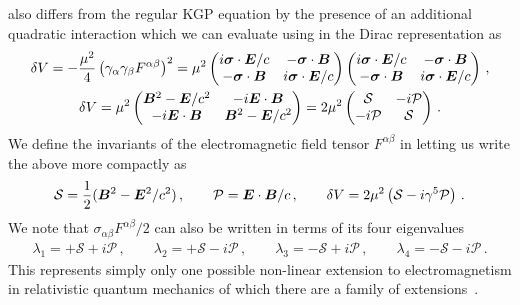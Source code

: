  also differs from the regular KGP equation by the presence of an additional quadratic interaction which we can evaluate using  in the Dirac representation as
\begin{gather}
    \label{quad:1} \delta V=-\frac{\mu^{2}}{4}\left(\gamma_{\alpha}\gamma_{\beta}F^{\alpha\beta}\right)^{2}=\mu^{2}
    \begin{pmatrix}
        i\boldsymbol{\sigma}\cdot\boldsymbol{E}/c & -\boldsymbol{\sigma}\cdot\boldsymbol{B} \\
        -\boldsymbol{\sigma}\cdot\boldsymbol{B} & i\boldsymbol{\sigma}\cdot\boldsymbol{E}/c
    \end{pmatrix}
    \begin{pmatrix}
        i\boldsymbol{\sigma}\cdot\boldsymbol{E}/c & -\boldsymbol{\sigma}\cdot\boldsymbol{B} \\
        -\boldsymbol{\sigma}\cdot\boldsymbol{B} & i\boldsymbol{\sigma}\cdot\boldsymbol{E}/c
    \end{pmatrix}\,,\\
    \label{quad:2}
    \delta V = \mu^{2}
    \begin{pmatrix}
        \boldsymbol{B}^{2}-\boldsymbol{E}/c^{2} & -i\boldsymbol{E}\cdot\boldsymbol{B} \\
        -i\boldsymbol{E}\cdot\boldsymbol{B} & \boldsymbol{B}^{2}-\boldsymbol{E}/c^{2}
    \end{pmatrix}=2\mu^{2}
    \begin{pmatrix}
        \mathcal{S} & -i\mathcal{P} \\
        -i\mathcal{P} & \mathcal{S}
    \end{pmatrix}\,.
\end{gather}
We define the invariants of the electromagnetic field tensor $F^{\alpha\beta}$ in   letting us write the above more compactly as
\begin{alignat}{1}
    \label{inv:1} \mathcal{S}=\frac{1}{2}(\boldsymbol{B}^{2}-\boldsymbol{E}^{2}/c^{2})\,,\qquad
    \mathcal{P}=\boldsymbol{E}\cdot\boldsymbol{B}/c\,,\qquad
    \delta V=2\mu^{2}\left(\mathcal{S}-i\gamma^{5}\mathcal{P}\right)\,.
\end{alignat}
We note that $\sigma_{\alpha\beta}F^{\alpha\beta}/2$ can also be written in terms of its four eigenvalues
\begin{align}
    \label{inv:2}
    \lambda_{1}=+\mathcal{S}+i\mathcal{P}\,,\qquad
    \lambda_{2}=+\mathcal{S}-i\mathcal{P}\,,\qquad
    \lambda_{3}=-\mathcal{S}+i\mathcal{P}\,,\qquad
    \lambda_{4}=-\mathcal{S}-i\mathcal{P}\,.
\end{align}
This represents simply only one possible non-linear extension to electromagnetism in relativistic quantum mechanics of which there are a family of extensions~\citep{Foldy:1952a}.


